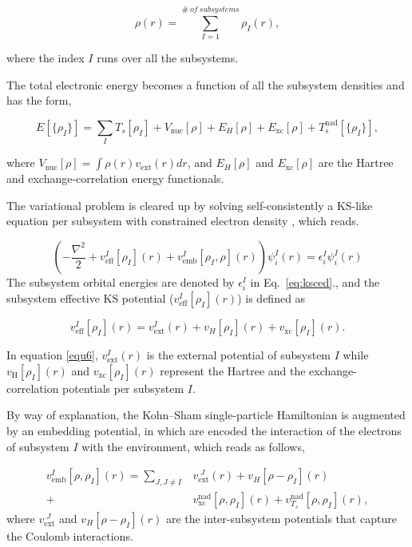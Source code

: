 \documentclass[notitlepage,12pt]{report}
\begin{document}
\begin{equation}\label{eq:sumdensity}
	\rho(r) = \sum\limits_{I=1}^{ \# \ of \ subsystems} \rho_{I}(r),
\end{equation}

where the index $I$ runs over all the subsystems.

The total electronic energy becomes a function of all the subsystem densities and has the form,

\begin{equation}
	E[\{\rho_I\}] = \sum\limits_I T_{s}[\rho_I] + V_{\mathrm{nuc}}[\rho] + E_H[\rho] + E_{\mathrm{xc}}[\rho] + T_{s}^{\mathrm{nad}}[\{\rho_I\}],
\end{equation}

where $V_{\mathrm{nuc}}[\rho]=\int \rho(r) v_\mathrm{ext}(r)dr$, and $E_H[\rho]$ and $E_{\mathrm{xc}}[\rho]$ are the Hartree  and exchange-correlation energy functionals.

The variational problem is cleared up by solving self-consistently a KS-like equation per subsystem with constrained electron density \supercite{wesolowski1994ab}, which reads.

\begin{equation}\label{eq:ksced}
	\left( -\frac{\nabla^2}{2} + v_{\mathrm{eff}}^{I}[\rho_I](r) + v_{\mathrm{emb}}^{I}[\rho_{I},\rho](r) \right) \psi_{i}^I(r) = \epsilon_{i}^I \psi_{i}^I(r)
\end{equation}
The subsystem orbital energies are denoted by $\epsilon_{i}^I$ in Eq.\ \ref{eq:ksced}.\supercite{sDFT}, and the subsystem effective KS potential ($v_{\mathrm{eff}}^{I}[\rho_I](r)$) is defined as

\begin{equation}\label{equ6}
	v_{\mathrm{eff}}^{I}[\rho_I](r) = v_{\mathrm{ext}}^I(r) + v_{{H}}[\rho_I](r) + v_{\mathrm{xc}}[\rho_I](r).
\end{equation}

In equation \ref{equ6},  $v_{\mathrm{ext}}^I(r)$ is the  external potential of subsystem $I$ while $v_{\mathrm{H}}[\rho_I](r)$ and $v_{\mathrm{xc}}[\rho_I](r)$ represent the Hartree and the exchange-correlation potentials per subsystem $I$.

By way of explanation, the Kohn–Sham single-particle Hamiltonian is augmented by an embedding potential, in which  are encoded the interaction of the electrons of subsystem $I$ with the environment, which reads as follows,

\begin{equation}\label{embedd}
	\begin{aligned}
		v_{\mathrm{emb}}^{I}[\rho,\rho_I](r) = \sum\limits_{J,J \neq I} &v_{\mathrm{ext}}^{\; J}(r) + v_{{H}}[\rho - \rho_I](r)  \\ + \ &v_{\mathrm{xc}}^{\mathrm{nad}}[\rho,\rho_{I}](r) + v_{T_s}^{\mathrm{nad}}[\rho,\rho_{I}](r),
	\end{aligned}
\end{equation}
where $v_{\mathrm{ext}}^{\; J}$ and $v_{{H}}[\rho - \rho_I](r)$ are the inter-subsystem potentials that capture the Coulomb interactions. 
\end{document}
